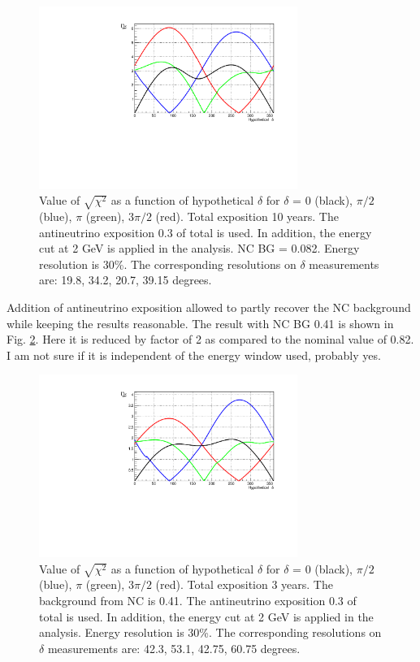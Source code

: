 \documentclass[prd,showpacs,groupedaddress,superscriptaddress,amsmath,amssymb]{revtex4-2} %
\begin{document}
\begin{figure}[h]
\begin{center}
\includegraphics[width=0.75\textwidth]{del_anu10.pdf}
\caption {Value of $\sqrt{\chi^2}$ as a function of hypothetical $\delta$ for $\delta$ = 0 (black), $\pi/2$ (blue), $\pi$ (green), $3\pi/2$ (red).
          Total exposition 10 years.
          The antineutrino exposition 0.3 of total is used. In addition, the energy cut at 2 GeV is applied in the analysis. NC BG = 0.082.
          Energy resolution is 30\%. The corresponding resolutions on $\delta$ measurements are: 19.8, 34.2, 20.7, 39.15 degrees.
\label{fig:del_anu10}}
\end{center}
\end{figure}

 Addition of antineutrino exposition allowed to partly recover the NC background while keeping the results reasonable. The result with NC BG 0.41
is shown in Fig. \ref{fig:del_anuNC04}. Here it is reduced by factor of 2 as compared to the nominal value of 0.82. I am not sure if it is
independent of the energy window used, probably yes.

\begin{figure}[h]
\begin{center}
\includegraphics[width=0.75\textwidth]{del_anuNC04.pdf}
\caption {Value of $\sqrt{\chi^2}$ as a function of hypothetical $\delta$ for $\delta$ = 0 (black), $\pi/2$ (blue), $\pi$ (green), $3\pi/2$ (red).
          Total exposition 3 years. The background from NC is 0.41.
          The antineutrino exposition 0.3 of total is used. In addition, the energy cut at 2 GeV is applied in the analysis. Energy resolution is 30\%.
          The corresponding resolutions on $\delta$ measurements are: 42.3, 53.1, 42.75, 60.75 degrees.
\label{fig:del_anuNC04}}
\end{center}
\end{figure}
\end{document}
